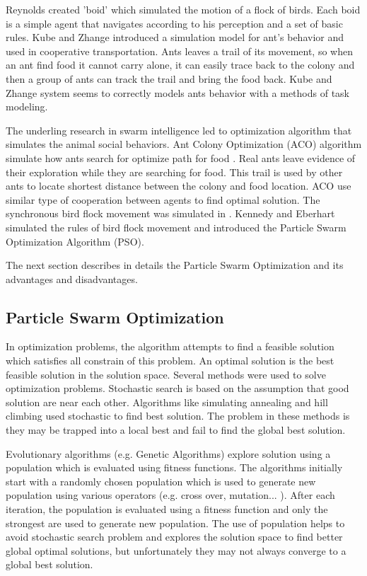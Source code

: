 Reynolds \cite{swarmflock} created 'boid' which simulated the motion of a flock of birds. Each boid is a simple agent that navigates according to his perception and a set of basic rules.  Kube and Zhange \cite{antsimulation} introduced a simulation model for ant's behavior and used in cooperative transportation. Ants leaves a trail of its movement, so when an ant find food it cannot carry alone, it can easily trace back to the colony and then a group of ants can track the trail and bring the food back. Kube and Zhange \cite{antsimulation,swarmGeneral} system seems to correctly models ants behavior with a methods of task modeling. 

The underling research in swarm intelligence led to optimization algorithm that simulates the animal social behaviors. Ant Colony Optimization (ACO) algorithm simulate how ants search for optimize path for food \cite{ACOFirst}. Real ants leave evidence of their exploration while they are searching for food. This trail is used by other ants to locate shortest distance between the colony and food location. ACO use similar type of cooperation between agents to find optimal solution.  The synchronous bird flock movement was simulated in \cite{PSOFirst,PSO2}.  Kennedy and Eberhart \cite{PSOFirst,PSO2} simulated the rules of bird flock movement and introduced the Particle Swarm Optimization Algorithm (PSO).

   The next section describes in details the Particle Swarm Optimization and its advantages and disadvantages. 
 \subsection{Particle Swarm Optimization}
 In optimization problems, the algorithm attempts to find a feasible solution which satisfies all constrain of this problem. An optimal solution is the best feasible solution in the solution space. Several methods were used to solve optimization problems. Stochastic search is based on the assumption that good solution are near each other. Algorithms like simulating annealing and hill climbing used stochastic to find best solution. The problem in these methods is they may be trapped into a local best and fail to find the global best solution.
 
  Evolutionary algorithms (e.g. Genetic Algorithms) explore solution using a population which is evaluated using fitness functions. The algorithms initially start with a randomly chosen population which is used to generate new population using various operators (e.g. cross over, mutation... ).  After each iteration, the population is evaluated using a fitness function and only the strongest are used to generate new population. The use of population helps to avoid stochastic search problem and explores the solution space to find better global optimal solutions, but unfortunately they may not always converge to a global best solution\cite{PSOpattern}. 
 
